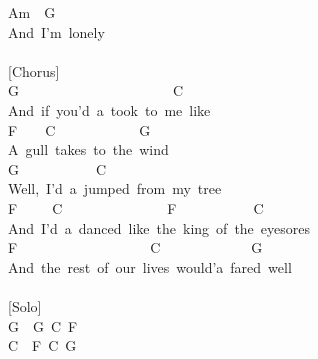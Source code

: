 \documentclass[]{book}
\begin{document}
\hspace*{0.333em}\hspace*{0.333em}\hspace*{0.333em}\hspace*{0.333em}\hspace*{0.333em}\hspace*{0.333em}\hspace*{0.333em}\hspace*{0.333em}Am~~G\\
And~I'm~lonely\\
~\\
{[}Chorus{]}\\
G~~~~~~~~~~~~~~~~~~~~~~C\\
And~if~you'd~a~took~to~me~like\\
\hspace*{0.333em}\hspace*{0.333em}F~~~~C~~~~~~~~~~~~G\\
A~gull~takes~to~the~wind\\
\hspace*{0.333em}\hspace*{0.333em}\hspace*{0.333em}\hspace*{0.333em}\hspace*{0.333em}\hspace*{0.333em}\hspace*{0.333em}\hspace*{0.333em}\hspace*{0.333em}\hspace*{0.333em}\hspace*{0.333em}\hspace*{0.333em}G~~~~~~~~~~~C\\
Well,~I'd~a~jumped~from~my~tree\\
\hspace*{0.333em}\hspace*{0.333em}\hspace*{0.333em}\hspace*{0.333em}F~~~~~C~~~~~~~~~~~~~~~F~~~~~~~~~~~C\\
And~I'd~a~danced~like~the~king~of~the~eyesores\\
F~~~~~~~~~~~~~~~~~~~C~~~~~~~~~~~~~G\\
And~the~rest~of~our~lives~would'a~fared~well\\
~\\
{[}Solo{]}\\
G~~G~C~F\\
C~~F~C~G\\
\end{document}
